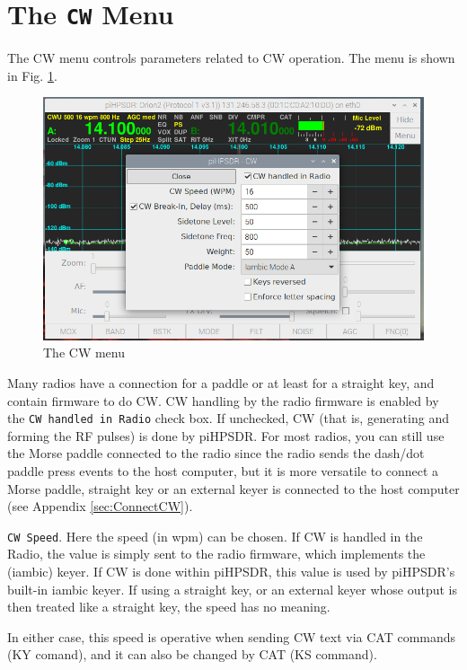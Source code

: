 \documentclass[12pt]{book}
\def\rett#1{\texttt{\color{red}#1}}
\begin{document}
\section{The \texttt{CW} Menu}
The CW menu controls parameters related to CW operation. The menu
is shown in Fig. \ref{fig:CWMenu}.

\begin{figure}[ht]
\center
\includegraphics[width=12cm]{CWMenu.png}
\caption{The CW menu}
\label{fig:CWMenu}
\end{figure}

Many radios have a connection for a paddle or at least for
a straight key, and contain firmware to do CW. CW handling by
the radio firmware is enabled by the \rett{CW handled in Radio}
check box. If unchecked, CW (that is, generating and forming
the RF pulses) is done by piHPSDR. For most radios, you can
still use the Morse paddle connected to the radio since the
radio sends the dash/dot paddle press events to the host
computer, but it is more versatile to connect
a Morse paddle, straight key or an external keyer is connected
to the host computer (see Appendix \ref{sec:ConnectCW}).

\rett{CW Speed}. Here the speed (in wpm) can be chosen. If CW is
handled in the Radio, the value is simply sent to the radio firmware,
which implements the (iambic) keyer. If CW is done within piHPSDR,
this value is used by piHPSDR's built-in iambic keyer. If using
a straight key, or an external keyer whose output is then treated
like a straight key, the speed has no meaning.

In either case, this speed is operative when sending CW text via
CAT commands (KY comand), and it can also be changed by CAT
(KS command).
\end{document}

